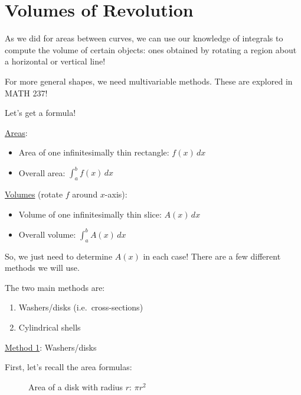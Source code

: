 \section{Volumes of Revolution}
As we did for areas between curves, we can use our knowledge of
integrals to compute the volume of certain objects: ones obtained
by rotating a region about a horizontal or vertical line!

\begin{Remark}{}{}
    For more general shapes, we need multivariable methods. These are
    explored in MATH 237!
\end{Remark}

Let's get a formula!

\underline{Areas}:
\begin{itemize}
    \item Area of one infinitesimally thin rectangle: $ f(x)\,dx $
    \item Overall area: $ \int_{a}^{b} f(x)\, d{x}  $
\end{itemize}
\underline{Volumes} (rotate $ f $ around $ x $-axis):
\begin{itemize}
    \item Volume of one infinitesimally thin slice: $ A(x)\,dx $
    \item Overall volume: $ \int_{a}^{b} A(x)\, d{x} $
\end{itemize}

So, we just need to determine $ A(x) $ in each case! There are
a few different methods we will use.

The two main methods are:
\begin{enumerate}
    \item Washers/disks (i.e.\ cross-sections)
    \item Cylindrical shells
\end{enumerate}

\underline{Method 1}: Washers/disks

First, let's recall the area formulas:

\begin{figure}
    \centering
    \caption{Area of a disk with radius $ r $: $ \pi r^2 $}
\end{figure}

